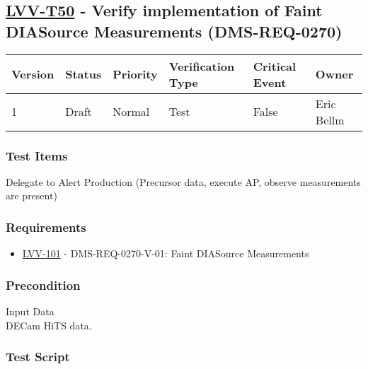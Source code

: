 \hypertarget{lvv-t50---verify-implementation-of-faint-diasource-measurements-dms-req-0270}{%
\subsection{\texorpdfstring{\href{https://jira.lsstcorp.org/secure/Tests.jspa\#/testCase/LVV-T50}{LVV-T50}
- Verify implementation of Faint DIASource Measurements
(DMS-REQ-0270)}{LVV-T50 - Verify implementation of Faint DIASource Measurements (DMS-REQ-0270)}}\label{lvv-t50---verify-implementation-of-faint-diasource-measurements-dms-req-0270}}

\begin{longtable}[]{@{}llllll@{}}
\toprule
Version & Status & Priority & Verification Type & Critical Event &
Owner\tabularnewline
\midrule
\endhead
1 & Draft & Normal & Test & False & Eric Bellm\tabularnewline
\bottomrule
\end{longtable}

\hypertarget{test-items-139}{%
\subsubsection{Test Items}\label{test-items-139}}

Delegate to Alert Production (Precursor data, execute AP, observe
measurements are present)

\hypertarget{requirements-140}{%
\subsubsection{Requirements}\label{requirements-140}}

\begin{itemize}
\tightlist
\item
  \href{https://jira.lsstcorp.org/browse/LVV-101}{LVV-101} -
  DMS-REQ-0270-V-01: Faint DIASource Measurements
\end{itemize}

\hypertarget{precondition-1}{%
\subsubsection{Precondition}\label{precondition-1}}

Input Data\\
\hspace*{0.333em}DECam HiTS data.

\hypertarget{test-script-140}{%
\subsubsection{Test Script}\label{test-script-140}}

